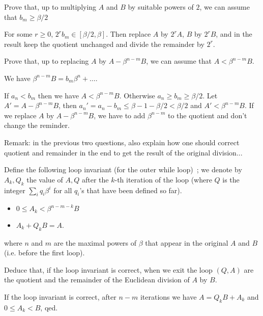 \documentclass[11pt]{exam}
\theoremstyle{definition}
\begin{document}
\begin{questions}
\question Prove that, up to multiplying $A$ and $B$ by suitable
powers of $2$, we can assume that $b_{m} \geq \beta / 2$
\bigskip

\begin{solution}
For some $r \geq 0$, $2^r b_{m} \in [\beta/2, \beta]$.
Then replace $A$ by $2^r A$, $B$ by $2^r B$, and in the result keep
the quotient unchanged and divide the remainder by $2^r$. 
\end{solution}

\question Prove that, up to replacing $A$ by $A - \beta^{n-m}B$, we can
assume that $A < \beta^{n-m} B$.
\bigskip

\begin{solution}
We have $\beta^{n-m} B = b_m \beta^n + \dots$.

If $a_n < b_m$ then we have $A < \beta^{n-m} B$. Otherwise $a_n \geq b_m \geq \beta/2$. Let $A' = A - \beta^{n-m}B$, then $a_n' = a_n - b_m \leq \beta-1-\beta/2 < \beta/2$ and $A' < \beta^{n-m} B$.
If we replace $A$ by $A - \beta^{n-m} B$, we have to add $\beta^{n-m}$ to the quotient and don't change the reminder. 
\end{solution}

Remark: in the previous two questions, also explain how one should
  correct quotient and remainder in the end to get the result of the
  original division...
\bigskip

Define the following loop invariant (for the outer
while loop)~; we denote by $A_k, Q_k$ the value of $A, Q$ after the
$k$-th iteration of the loop (where $Q$ is the integer $\sum_i q_i \beta^i$ for all $q_i$'s that have been defined so far).
\begin{itemize}
\item $0\leq A_k < \beta^{n-m-k} B$
\item $A_k + Q_k B = A$. 
\end{itemize}
where $n$ and $m$ are the maximal powers of $\beta$ that appear in the original $A$ and $B$ (i.e. before the first loop).
\bigskip

\question Deduce that, if the loop invariant is correct, when we exit the
loop $(Q, A)$ are the quotient and the remainder of the Euclidean division
of $A$ by $B$.
\bigskip

\begin{solution}
If the loop invariant is correct, after $n-m$ iterations
we have $A = Q_k B + A_k$ and $0 \leq A_k < B$, qed. 
\end{solution}


\end{questions}
\end{document}
